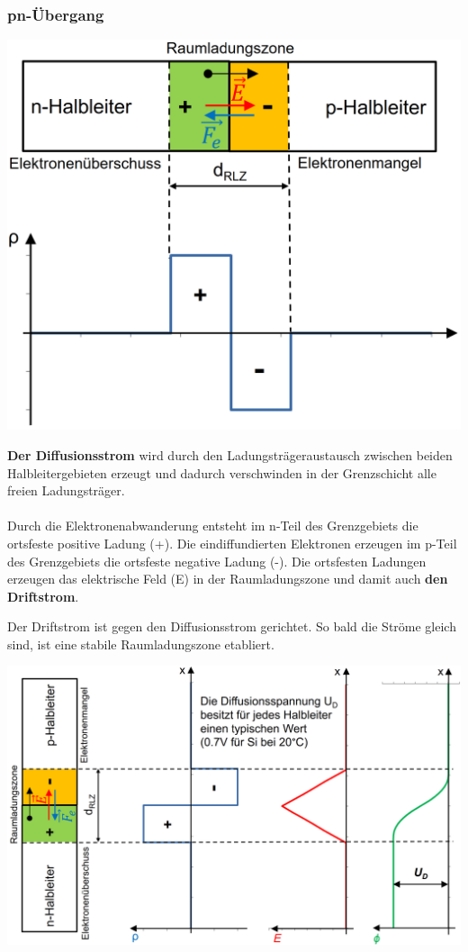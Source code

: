 \subsubsection{pn-Übergang}
\begin{minipage}[c]{0.48\columnwidth}
    \includegraphics[width=\columnwidth]{images/Bild5.png}\\
\end{minipage}
\hfill
\begin{minipage}[c]{0.48\columnwidth}
    \textbf{Der Diffusionsstrom} wird durch den Ladungsträgeraustausch zwischen beiden Halbleitergebieten erzeugt und dadurch verschwinden in der Grenzschicht alle freien Ladungsträger.\\\\
    Durch die Elektronenabwanderung entsteht im n-Teil des Grenzgebiets die ortsfeste positive Ladung (+). Die eindiffundierten Elektronen erzeugen im p-Teil des Grenzgebiets die ortsfeste negative Ladung (-). Die ortsfesten Ladungen erzeugen das elektrische Feld (E) in der Raumladungszone und damit auch \textbf{den Driftstrom}.\\
\end{minipage}
Der Driftstrom ist gegen den Diffusionsstrom gerichtet. So bald die Ströme gleich sind, ist eine stabile Raumladungszone etabliert.

\includegraphics[width=\columnwidth]{images/Bild6.png}\\
